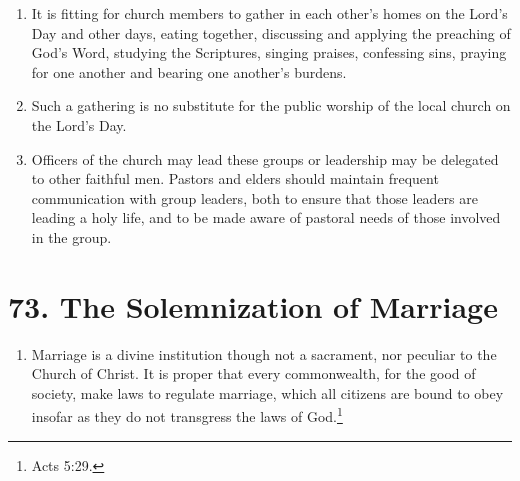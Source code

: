\documentclass[
]{book}
\providecommand{\tightlist}{%
  \setlength{\itemsep}{0pt}\setlength{\parskip}{0pt}}
\begin{document}
\begin{enumerate}
\def\labelenumi{\arabic{enumi}.}
\tightlist
\item
  \protect\hypertarget{72}{\href{}{}}It is fitting for church members to gather in each other's homes on the Lord's Day and other days, eating together, discussing and applying the preaching of God's Word, studying the Scriptures, singing praises, confessing sins, praying for one another and bearing one another's burdens.
\item
  Such a gathering is no substitute for the public worship of the local church on the Lord's Day.
\item
  Officers of the church may lead these groups or leadership may be delegated to other faithful men. Pastors and elders should maintain frequent communication with group leaders, both to ensure that those leaders are leading a holy life, and to be made aware of pastoral needs of those involved in the group.
\end{enumerate}

\hypertarget{the-solemnization-of-marriage}{%
\section*{73. The Solemnization of Marriage}\label{the-solemnization-of-marriage}}

\protect\hypertarget{chapter-slug-73-the-solemnization-of-marriage}{\href{}{}}

\begin{enumerate}
\def\labelenumi{\arabic{enumi}.}
\tightlist
\item
  \protect\hypertarget{73}{\href{}{}}Marriage is a divine institution though not a sacrament, nor peculiar to the Church of Christ. It is proper that every commonwealth, for the good of society, make laws to regulate marriage, which all citizens are bound to obey insofar as they do not transgress the laws of God.\footnote{Acts 5:29.}
\end{enumerate}
\end{document}
